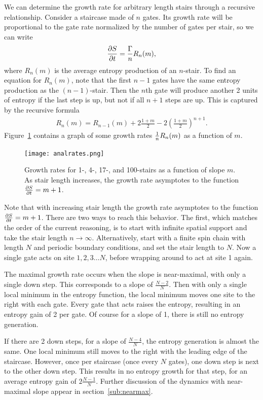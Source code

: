 We can determine the growth rate for arbitrary length stairs through a recursive relationship. Consider a staircase made of $n$ gates. Its growth rate will be proportional to the gate rate normalized by the number of gates per stair, so we can write
\begin{align}
\frac{\partial S}{\partial t} = \frac{\Gamma}{n}R_n(m), \label{eqn:growthrate}
\end{align}
where $R_n(m)$ is the average entropy production of an $n$-stair. To find an equation for $R_n(m)$, note that the first $n-1$ gates have the same entropy production as the $(n-1)$-stair. Then the $n$th gate will produce another 2 units of entropy if the last step is up, but not if all $n+1$ steps are up. This is captured by the recursive formula
\begin{align}
R_n(m) = R_{n-1}(m)+2\frac{1+m}{2} - 2\left(\frac{1+m}{2}\right)^{n+1}. \label{eqn:raterecur}
\end{align}
Figure~\ref{fig:growthrates} contains a graph of some growth rates $\frac{1}{n}R_n(m)$ as a function of $m$.

\begin{figure}
	\centering
	\texttt{[image: analrates.png]}
	\caption{Growth rates for 1-, 4-, 17-, and 100-stairs as a function of slope $m$. As stair length increases, the growth rate asymptotes to the function $\frac{\partial S}{\partial t} = m+1$.}
	\label{fig:growthrates}
\end{figure}

Note that with increasing stair length the growth rate asymptotes to the function $\frac{\partial S}{\partial t} = m+1$. There are two ways to reach this behavior. The first, which matches the order of the current reasoning, is to start with infinite spatial support and take the stair length $n\to\infty$. Alternatively, start with a finite spin chain with length $N$ and periodic boundary conditions, and set the stair length to $N$. Now a single gate acts on site $1,2,3\dots N$, before wrapping around to act at site 1 again. 

The maximal growth rate occurs when the slope is near-maximal, with only a single down step. This corresponds to a slope of $\frac{N-2}{N}$. Then with only a single local minimum in the entropy function, the local minimum moves one site to the right with each gate. Every gate that acts raises the entropy, resulting in an entropy gain of 2 per gate. Of course for a slope of 1, there is still no entropy generation.

If there are 2 down steps, for a slope of $\frac{N-4}{N}$, the entropy generation is almost the same. One local minimum still moves to the right with the leading edge of the staircase. However, once per staircase (once every $N$ gates), one down step is next to the other down step. This results in no entropy growth for that step, for an average entropy gain of $2\frac{N-1}{N}$. Further discussion of the dynamics with near-maximal slope appear in section~\ref{sub:nearmax}.

